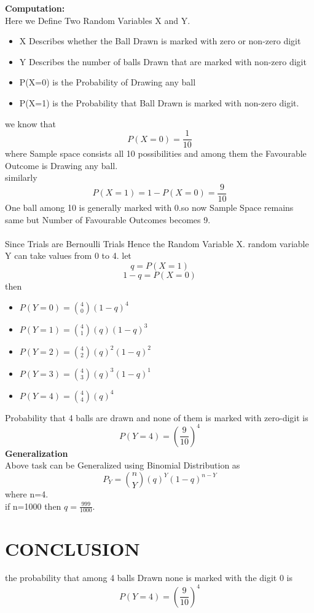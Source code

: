\documentclass[journal,12pt,twocolumn]{IEEEtran}
\begin{document}
\textbf{Computation:}\\ 
Here we Define Two Random Variables X and Y. \\
\begin{itemize}
    \item X Describes whether the Ball Drawn is marked with zero or non-zero digit\\
    \item Y Describes the number of balls Drawn that are marked with non-zero digit \\
    \item P(X=0) is the Probability of Drawing any ball \\
    \item  P(X=1) is the Probability that Ball Drawn is marked with non-zero digit.\\
\end{itemize}
we know that
\begin{equation}
    P(X=0)=\frac{1}{10}
\end{equation}
where Sample space consists all 10 possibilities and among  them the Favourable Outcome is Drawing any ball.\\
similarly
\begin{equation}
    P(X=1)=1-P(X=0)=\frac{9}{10}
\end{equation}
One ball among 10 is generally marked with 0.so now Sample Space remains same but Number of Favourable Outcomes becomes 9.\\  \\
Since Trials are  Bernoulli Trials Hence the Random Variable X.
random variable Y can take values from 0 to 4.
let
\begin{equation}
    q=P(X=1)
\end{equation}
\begin{equation}
    1-q=P(X=0)
\end{equation}
then
\begin{itemize}
    \item $P(Y=0)=\binom{4}{0}(1-q)^4$ \\
    \item $P(Y=1)=\binom{4}{1}(q)(1-q)^3$ \\
    \item $P(Y=2)=\binom{4}{2}(q)^2(1-q)^2 $ \\
    \item $P(Y=3)=\binom{4}{3}(q)^3(1-q)^1$ \\
    \item $P(Y=4)=\binom{4}{4}(q)^4 $ \\
\end{itemize}
 Probability that 4 balls are drawn and none of them is marked with zero-digit is 
\begin{equation}
    P(Y=4)=\left(\frac{9}{10}\right)^4
\end{equation}
\textbf{Generalization}\\
Above task can be Generalized using Binomial Distribution as
\begin{equation}
    P_Y=\binom{n}{Y}(q)^Y(1-q)^{n-Y}
\end{equation}
where n=4.\\
if n=1000 then $q=\frac{999}{1000}$.
\section{\textbf{CONCLUSION}}
the probability that among 4 balls Drawn  none is marked with the digit 0 is
\begin{equation}
    P(Y=4)=\left(\frac{9}{10}\right)^4
\end{equation}
\end{document}
